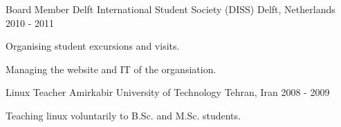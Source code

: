 

\begin{cventries}

  \cventry
    {Board Member} %
    {Delft International Student Society (DISS)} %
    {Delft, Netherlands} %
    {2010 - 2011} %
    {
      \begin{cvitems} %
        \item {Organising student excursions and visits.}
        \item {Managing the website and IT of the organsiation.}
      \end{cvitems}
    }

  \cventry
    {Linux Teacher} %
    {Amirkabir University of Technology} %
    {Tehran, Iran} %
    {2008 - 2009} %
    {
      \begin{cvitems} %
        \item {Teaching linux voluntarily to B.Sc. and M.Sc. students. }
      \end{cvitems}
    }


\end{cventries}
